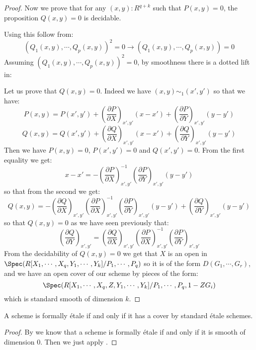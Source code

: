\begin{proof}
Now we prove that for any $(x,y):R^{q+k}$ such that $P(x,y)=0$, the proposition $Q(x,y)=0$ is decidable.

Using  this follow from:
\[(Q_1(x,y),\cdots,Q_p(x,y))^2=0 \to (Q_1(x,y),\cdots,Q_p(x,y))=0\]
Assuming $(Q_1(x,y),\cdots,Q_p(x,y))^2=0$, by smoothness there is a dotted lift in:
\begin{center}
\end{center}
Let us prove that $Q(x,y) = 0$. Indeed we have $(x,y) \sim_1 (x',y')$ so that we have:
\[P(x,y) = P(x',y')+ \left(\frac{\partial P}{\partial X}\right)_{x',y'}(x-x') + \left(\frac{\partial P}{\partial Y}\right)_{x',y'}(y-y') \]
\[Q(x,y) = Q(x',y')+ \left(\frac{\partial Q}{\partial X}\right)_{x',y'}(x-x') + \left(\frac{\partial Q}{\partial Y}\right)_{x',y'}(y-y') \]
Then we have $P(x,y) = 0$, $P(x',y')=0$ and $Q(x',y') = 0$. From the first equality we get:
\[x-x' =  -\left(\frac{\partial P}{\partial X}\right)_{x',y'}^{-1}\left(\frac{\partial P}{\partial Y}\right)_{x',y'}(y-y')\]
so that from the second we get:
\[Q(x,y) = -\left(\frac{\partial Q}{\partial X}\right)_{x',y'}\left(\frac{\partial P}{\partial X}\right)_{x',y'}^{-1}\left(\frac{\partial P}{\partial Y}\right)_{x',y'}(y-y') + \left(\frac{\partial Q}{\partial Y}\right)_{x',y'}(y-y')\]
so that $Q(x,y)=0$ as we have seen previously that:
\[\left(\frac{\partial Q}{\partial Y}\right)_{x',y'} = \left(\frac{\partial Q}{\partial X}\right)_{x',y'}\left(\frac{\partial P}{\partial X}\right)_{x',y'}^{-1} \left(\frac{\partial P}{\partial Y}\right)_{x',y'} \]
From the decidability of $Q(x,y)=0$ we get that $X$ is an open in $\Spec(R[X_1,\cdots,X_q,Y_1,\cdots,Y_k]/P_1,\cdots,P_q)$
so it is of the form $D(G_1,\cdots,G_r)$, and we have an open cover of our scheme by pieces of the form:
\[\Spec(R[X_1,\cdots,X_q,Z,Y_1,\cdots,Y_k]/P_1,\cdots,P_q,1-ZG_i)\]
which is standard smooth of dimension $k$.
\end{proof}

\begin{corollary}
A scheme is formally étale if and only if it has a cover by standard étale schemes.
\end{corollary}

\begin{proof}
By  we know that a scheme is formally étale if and only if it is smooth of dimension $0$. Then we just apply .
\end{proof}

